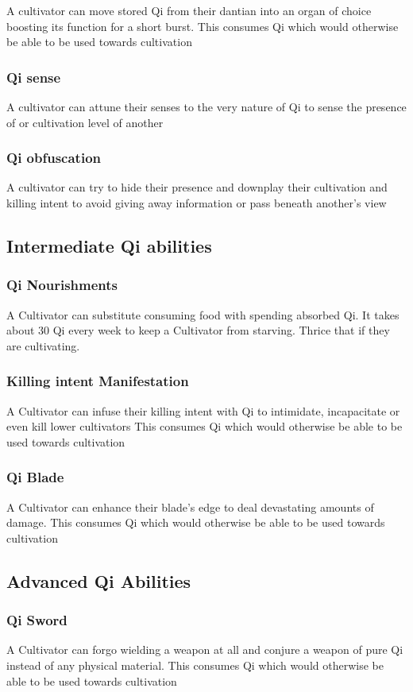 A cultivator can move stored Qi from their dantian into an organ of choice boosting its function for a short burst.
This consumes Qi which would otherwise be able to be used towards cultivation

\subsubsection{Qi sense}
A cultivator can attune their senses to the very nature of Qi to sense the presence of or cultivation level of another

\subsubsection{Qi obfuscation}
A cultivator can try to hide their presence and downplay their cultivation and killing intent to avoid giving away information or pass beneath another's view

\subsection{Intermediate Qi abilities}

\subsubsection{Qi Nourishments}
A Cultivator can substitute consuming food with spending absorbed Qi. It takes about 30 Qi every week to keep a Cultivator from starving. 
Thrice that if they are cultivating.

\subsubsection{Killing intent Manifestation}
A Cultivator can infuse their killing intent with Qi to intimidate, incapacitate or even kill lower cultivators
This consumes Qi which would otherwise be able to be used towards cultivation

\subsubsection{Qi Blade}
A Cultivator can enhance their blade's edge to deal devastating amounts of damage.
This consumes Qi which would otherwise be able to be used towards cultivation

\subsection{Advanced Qi Abilities}
\subsubsection{Qi Sword}
A Cultivator can forgo wielding a weapon at all and conjure a weapon of pure Qi instead of any physical material.
This consumes Qi which would otherwise be able to be used towards cultivation
